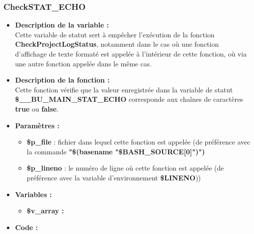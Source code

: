 \documentclass[a4paper,10pt]{article}
\begin{document}
\subsubsection{CheckSTAT\_ECHO}\color{white}
\begin{itemize}
    \item \textbf{Description de la variable :}\\
    Cette variable de statut sert à empêcher l'exécution de la fonction \textbf{\color{mauve}CheckProjectLogStatus}, notamment dans le cas où une fonction d'affichage de texte formaté est appelée à l'intérieur de cette fonction, où via une autre fonction appelée dans le même cas.\\[1\baselineskip]

    \item \textbf{Description de la fonction :}\\
        Cette fonction vérifie que la valeur enregistrée dans la variable de statut \textbf{\color{orange}\$\_\_BU\_MAIN\_STAT\_ECHO} corresponde aux chaînes de caractères \textbf{true} ou \textbf{false}.\\[1\baselineskip]

    \item \textbf{Paramètres :}
    \begin{itemize}
        \item \color{orange}\textbf{\$p\_file}\color{white} : fichier dans lequel cette fonction est appelée (de préférence avec la commande \textbf{"\$(\color{gray}basename \color{white}"\color{orange}\$BASH\_SOURCE[0]\color{white}")")}\\[1\baselineskip]

        \item \color{orange}\textbf{\$p\_lineno}\color{white} : le numéro de ligne où cette fonction est appelée (de préférence avec la variable d'environnement \textbf{\color{orange}\$LINENO}))\\[1\baselineskip]
    \end{itemize}

    \item \textbf{Variables :}
    \begin{itemize}
        \item \textbf{\color{orange}\$v\_array\color{white} :}\\[1\baselineskip]
    \end{itemize}


    \item \textbf{Code :}
\end{itemize}
\end{document}
